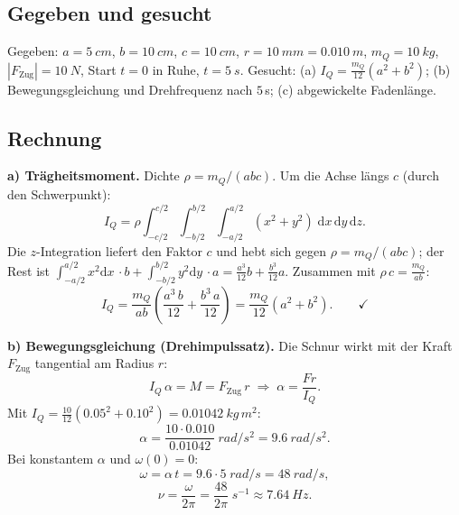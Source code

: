 
\subsection*{Gegeben und gesucht}
Gegeben: $a=\qty{5}{cm}$, $b=\qty{10}{cm}$, $c=\qty{10}{cm}$, $r=\qty{10}{mm}=\qty{0.010}{m}$,
$m_Q=\qty{10}{kg}$, $|F_\mathrm{Zug}|=\qty{10}{N}$, Start $t=0$ in Ruhe,
$t=\qty{5}{s}$.
Gesucht: (a) $I_Q=\frac{m_Q}{12}(a^2+b^2)$; (b) Bewegungsgleichung und
Drehfrequenz nach $5$\,s; (c) abgewickelte Fadenlänge.

\subsection*{Rechnung}
\textbf{a) Trägheitsmoment.} Dichte $\rho=m_Q/(abc)$. Um die Achse längs $c$
(durch den Schwerpunkt):
\begin{equation}
  I_Q = \rho\int_{-c/2}^{c/2}\!\!\!\int_{-b/2}^{b/2}\!\int_{-a/2}^{a/2}
        (x^2+y^2)\;\mathrm dx\,\mathrm dy\,\mathrm dz.
\end{equation}
Die $z$-Integration liefert den Faktor $c$ und hebt sich gegen $\rho=m_Q/(abc)$;
der Rest ist $\int_{-a/2}^{a/2}x^2\mathrm dx\,\cdot b + \int_{-b/2}^{b/2}y^2\mathrm dy\,\cdot a
=\frac{a^3}{12}b+\frac{b^3}{12}a$. Zusammen mit $\rho\,c=\frac{m_Q}{ab}$:
\begin{equation}
  I_Q = \frac{m_Q}{ab}\left(\frac{a^3\,b}{12}+\frac{b^3\,a}{12}\right)
  = \frac{m_Q}{12}(a^2+b^2). \qquad\checkmark
\end{equation}

\textbf{b) Bewegungsgleichung (Drehimpulssatz).} Die Schnur wirkt mit der Kraft
$F_\mathrm{Zug}$ tangential am Radius $r$:
\begin{equation}
  I_Q\,\alpha = M = F_\mathrm{Zug}\,r
  \;\Rightarrow\;
  \alpha = \frac{F r}{I_Q}.
\end{equation}
Mit $I_Q=\frac{10}{12}(0.05^2+0.10^2)=\qty{0.01042}{kg\,m^2}$:
\begin{equation}
  \alpha = \frac{10\cdot 0.010}{0.01042}\ \si{rad/s^2}
  = \qty{9.6}{rad/s^2}.
\end{equation}
Bei konstantem $\alpha$ und $\omega(0)=0$:
\begin{equation}
  \omega = \alpha\,t = 9.6\cdot 5\;\si{rad/s} = \qty{48}{rad/s},
\end{equation}
\begin{equation}
  \nu = \frac{\omega}{2\pi} = \frac{48}{2\pi}\;\si{s^{-1}}
  \approx \qty{7.64}{Hz}. 
\end{equation}


